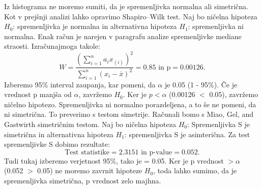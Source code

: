 \documentclass[a4paper,11pt]{article}
\begin{document}
Iz histograma ne moremo sumiti, da je spremenljivka normalna ali simetrična. Kot v prejšnji analizi lahko opravimo Shapiro–Wilk test. Naj bo ničelna hipoteza \(H_0\): spremenljivka je normalna in alternativna hipoteza \(H_1\): spremenljivka ni normalna. Enak račun je narejen v paragrafu analize spremenljivke mediane straosti. Izračunajmoga takole:
\[W = \frac{(\sum_{i = 1}^{n}a_i x_{(i)})^2}{\sum_{i = 1}^{n}(x_i - \overset{\_}{x})^2} = 0.85 \text{ in p} = 0.00126. \]
Izberemo 95\% interval zaupanja, kar pomeni, da \(\alpha\) je 0.05 (1 - 95\%). Če je vrednost p manjša od \(\alpha\), zavržemo \(H_0\). Ker je \(p < \alpha\) (0.00126 \(<\) 0.05), zavržemo ničelno hipotezo. Spremenljivka ni normalno porazdeljena, a to še ne pomeni, da ni simetrična. To preverimo s testom simetrije. Računali bomo s Miao, Gel, and Gastwirth simetričnim testom. Naj bo ničelna hipoteza \(H_0\): Spremenljivka S je simetrična in alternativna hipoteza \(H_1\): spremenljivka S je asimterična. Za test spremenljivke S dobimo rezultate:
\[\text{Test statistike} = 2.3151 \text{ in p-value} = 0.052.\]
Tudi tukaj izberemo verjetnost 95\%, tako je \alpha = 0.05. Ker je p vrednost \(> \alpha\) (0.052 \(>\) 0.05) ne moremo zavrnit hipoteze \(H_0\), toda lahko sumimo, da je spremenljivka simetrična, p vrednost zelo majhna.
\end{document}

